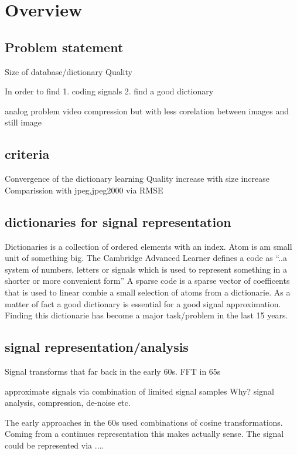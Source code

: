 \chapter{Overview}


\section{Problem statement}
Size of database/dictionary
Quality

In order to find 
1. coding signals 
2. find a good dictionary

analog problem video compression but with less corelation between images and still image 

\section{criteria}
Convergence of the dictionary learning
Quality increase with size increase 
Comparission with jpeg,jpeg2000 via RMSE

\section{dictionaries for signal representation}
Dictionaries is a collection of ordered elements with an index.
Atom is am small unit of something big.
The Cambridge Advanced Learner defines a code as ``..a system of numbers, letters or signals which is used to represent something in a shorter or more convenient form''
A sparse code is a sparse vector of coefficents that is used to linear combie a small selection of atoms from a dictionarie.
As a matter of fact a good dictionary is essential for a good signal approximation. \cite{} Finding this dictionarie has become a major task/problem in the last 15 years.

\section{signal representation/analysis}
Signal transforms \cite{sparse intro} that far back in the early 60s.
FFT in 65s

approximate signals via combination of limited signal samples
Why?
signal analysis, compression, de-noise etc.

The early approaches in the 60s used combinations of cosine transformations. Coming from a continues representation this makes 
actually sense. The signal could be represented via ....

